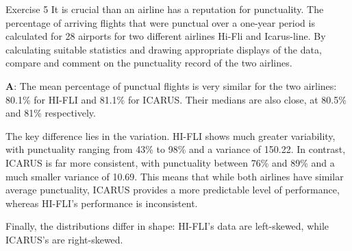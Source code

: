 \documentclass[
  ignorenonframetext,
  aspectratio=43,
]{beamer}
\begin{document}
\begin{frame}{Exercise 5}
\protect\hypertarget{exercise-5}{}
It is crucial than an airline has a reputation for punctuality. The
percentage of arriving flights that were punctual over a one-year period
is calculated for 28 airports for two different airlines Hi-Fli and
Icarus-line. By calculating suitable statistics and drawing appropriate
displays of the data, compare and comment on the punctuality record of
the two airlines.

\begin{table}
\centering
\tiny
{}
\end{table}
\end{frame}

\begin{frame}{}
\protect\hypertarget{section-11}{}
\textbf{A}: The mean percentage of punctual flights is very similar for
the two airlines: 80.1\% for HI-FLI and 81.1\% for ICARUS. Their medians
are also close, at 80.5\% and 81\% respectively.

The key difference lies in the variation. HI-FLI shows much greater
variability, with punctuality ranging from 43\% to 98\% and a variance
of 150.22. In contrast, ICARUS is far more consistent, with punctuality
between 76\% and 89\% and a much smaller variance of 10.69. This means
that while both airlines have similar average punctuality, ICARUS
provides a more predictable level of performance, whereas HI-FLI's
performance is inconsistent.

Finally, the distributions differ in shape: HI-FLI's data are
left-skewed, while ICARUS's are right-skewed.
\end{frame}
\end{document}
